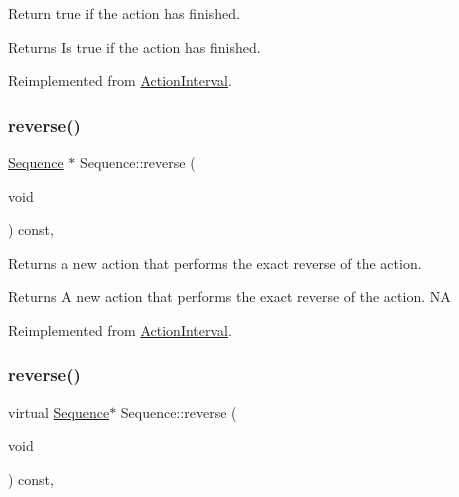 Return true if the action has finished.

\begin{DoxyReturn}{Returns}
Is true if the action has finished. 
\end{DoxyReturn}


Reimplemented from \hyperlink{classActionInterval_a466ff6a3a5f95e47d4d01bfa4775290d}{Action\+Interval}.

\mbox{\label{classSequence_ad637da9eb81e01e9b6535c23220f9221}} 
\subsubsection{\texorpdfstring{reverse()}{reverse()}\hspace{0.1cm}{\footnotesize\ttfamily [1/2]}}
{\footnotesize\ttfamily \hyperlink{classSequence}{Sequence} $\ast$ Sequence\+::reverse (\begin{DoxyParamCaption}\item[{void}]{ }\end{DoxyParamCaption}) const\hspace{0.3cm}{\ttfamily [override]}, {\ttfamily [virtual]}}

Returns a new action that performs the exact reverse of the action.

\begin{DoxyReturn}{Returns}
A new action that performs the exact reverse of the action.  NA 
\end{DoxyReturn}


Reimplemented from \hyperlink{classActionInterval_a9f9ac7164036a0bc261a72f62a2b2da7}{Action\+Interval}.

\mbox{\label{classSequence_ab0d19f0b8c2272921aab829f583a91f0}} 
\subsubsection{\texorpdfstring{reverse()}{reverse()}\hspace{0.1cm}{\footnotesize\ttfamily [2/2]}}
{\footnotesize\ttfamily virtual \hyperlink{classSequence}{Sequence}$\ast$ Sequence\+::reverse (\begin{DoxyParamCaption}\item[{void}]{ }\end{DoxyParamCaption}) const\hspace{0.3cm}{\ttfamily [override]}, {\ttfamily [virtual]}}

